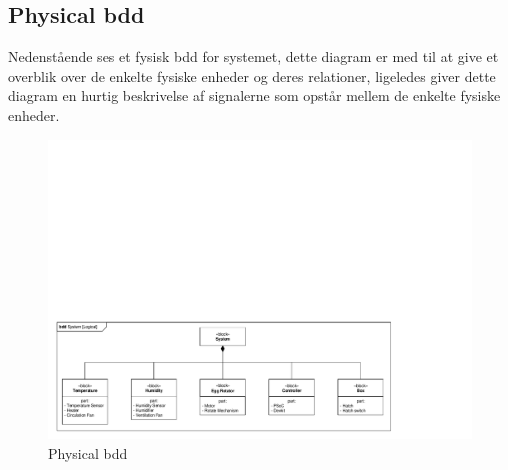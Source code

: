 
\subsection{Physical bdd}

Nedenstående ses et fysisk bdd for systemet, dette diagram er med til at give et overblik over de enkelte fysiske enheder og deres relationer, ligeledes giver dette diagram en hurtig beskrivelse af signalerne som opstår mellem de enkelte fysiske enheder. 

\begin{figure}[H]
\centering
\includegraphics[page=2,width=\linewidth,viewport=8mm 8mm 367mm 185mm]{./2_systemarkitektur/diagrammer/SYSML_Diagrammer_v4.pdf}
\caption[Diagram]{Physical bdd}
\label{fig:SystemStateDiagram}
\end{figure}

\clearpage